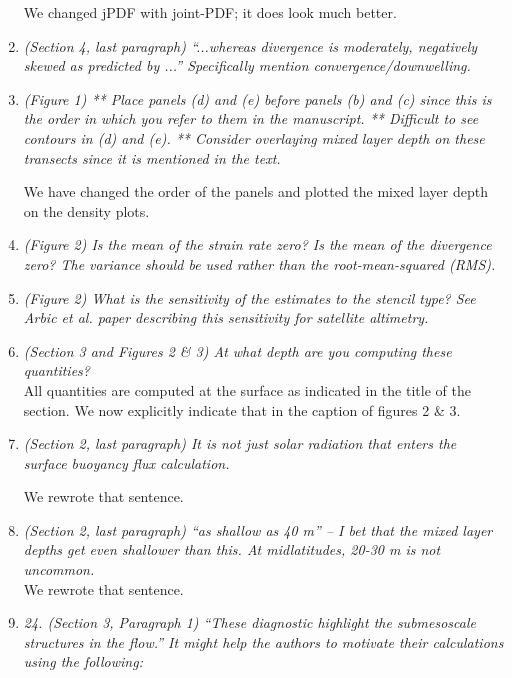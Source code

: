 \documentclass[11pt]{article}
\newcommand{\bdp}{\begin{description}}
\newcommand{\edp}{\end{description}}
\begin{document}
\begin{enumerate}
We changed jPDF with joint-PDF; it does look much better.

\item {\it (Section 4, last paragraph) ``...whereas divergence is moderately, negatively skewed as
        predicted by ...'' Specifically mention convergence/downwelling.}

\item {\it (Figure 1) ** Place panels (d) and (e) before panels (b) and (c) since this is the order
        in which you refer to them in the manuscript. ** Difficult to see contours in (d) and
        (e). ** Consider overlaying mixed layer depth on these transects since it is mentioned
        in the text.}

        \bdp
          We have changed the order of the panels and plotted the mixed layer depth
          on the density plots.
        \edp

\item {\it (Figure 2) Is the mean of the strain rate zero? Is the mean of the divergence zero? The
        variance should be used rather than the root-mean-squared (RMS).}


\item {\it (Figure 2) What is the sensitivity of the estimates to the stencil type? See Arbic et al.
        paper describing this sensitivity for satellite altimetry.}

\item {\it (Section 3 and Figures 2 \& 3) At what depth are you computing these quantities?}\\

  All quantities are computed at the surface as indicated in the title of the
  section. We now explicitly indicate that in the caption of figures 2 \& 3.

\item {\it (Section 2, last paragraph) It is not just solar radiation that enters the surface buoyancy
      flux calculation.}

      We rewrote that sentence.

\item {\it (Section 2, last paragraph) ``as shallow as 40 m'' – I bet that the mixed layer depths get
      even shallower than this. At midlatitudes, 20-30 m is not uncommon.}\\

      We rewrote that sentence.

\item {\it 24. (Section 3, Paragraph 1) ``These diagnostic highlight the submesoscale structures in
      the flow.'' It might help the authors to motivate their calculations using the following:}\\


\end{enumerate}
\end{document}
